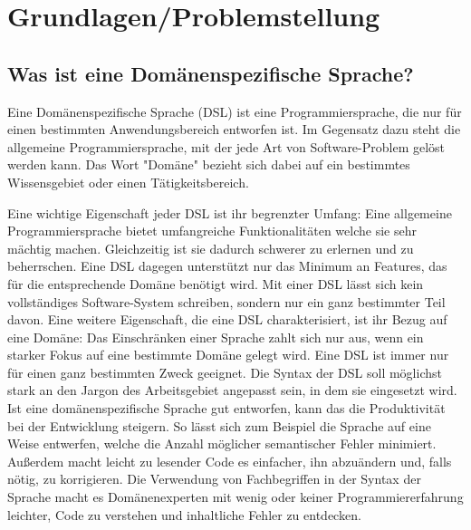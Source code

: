 
\chapter{Grundlagen/Problemstellung}\label{chp:grundlagen}

\section{Was ist eine Domänenspezifische Sprache?}\label{sct:dsldef}
Eine Domänenspezifische Sprache (DSL) ist eine Programmiersprache, die nur für einen bestimmten Anwendungsbereich entworfen ist. Im Gegensatz dazu steht die allgemeine Programmiersprache, mit der jede Art von Software-Problem gelöst werden kann\cite{www:fowlerDSL}. Das Wort "Domäne" bezieht sich dabei auf ein bestimmtes Wissensgebiet oder einen Tätigkeitsbereich.

Eine wichtige Eigenschaft jeder DSL ist ihr begrenzter Umfang: Eine allgemeine Programmiersprache bietet umfangreiche Funktionalitäten welche sie sehr mächtig machen. Gleichzeitig ist sie dadurch schwerer zu erlernen und zu beherrschen. Eine DSL dagegen unterstützt nur das Minimum an Features, das für die entsprechende Domäne benötigt wird. Mit einer DSL lässt sich kein vollständiges Software-System schreiben, sondern nur ein ganz bestimmter Teil davon.
Eine weitere Eigenschaft, die eine DSL charakterisiert, ist ihr Bezug auf eine Domäne: Das Einschränken einer Sprache zahlt sich nur aus, wenn ein starker Fokus auf eine bestimmte Domäne gelegt wird. Eine DSL ist immer nur für einen ganz bestimmten Zweck geeignet\cite{book:fowlerDSL}. Die Syntax der DSL soll möglichst stark an den Jargon des Arbeitsgebiet angepasst sein, in dem sie eingesetzt wird.
\\ %
Ist eine domänenspezifische Sprache gut entworfen, kann das die Produktivität bei der Entwicklung steigern. So lässt sich zum Beispiel die Sprache auf eine Weise entwerfen, welche die Anzahl möglicher semantischer Fehler minimiert. Außerdem macht leicht zu lesender Code es einfacher, ihn abzuändern und, falls nötig, zu korrigieren. Die Verwendung von Fachbegriffen in der Syntax der Sprache macht es Domänenexperten mit wenig oder keiner Programmiererfahrung leichter, Code zu verstehen und inhaltliche Fehler zu entdecken.

